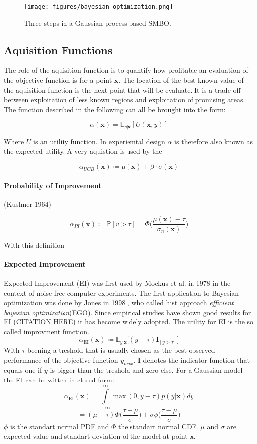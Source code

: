 \documentclass[english]{article}
\newcommand{\EI}{\operatorname{EI}}
\newcommand{\x}{\mathbf{x}}
\newcommand{\E}{\mathbb{E}}
\begin{document}
\begin{figure}
  \texttt{[image: figures/bayesian\_optimization.png]}
  \caption{Three steps in a Gaussian process based SMBO.}
  \label{bayesian optimization}
\end{figure}

\subsection{Aquisition Functions}

The role of the aquisition function is to quantify how profitable an evaluation of the objective function is for a point $\x$. The location of the best known value of the aquisition function is the next point that will be evaluate. It is a trade off between exploitation of less known regions and exploitation of promising areas. The function described in the following can all be brought into the form:

$$\alpha(\x) = \E_{y|\x}[U(\x,y)]$$

Where $U$ is an utility function. In experiemtal design $\alpha$ is therefore also known as the expected utility.
A very aquistion is used by the

$$\alpha_{UCB}(\x) \coloneqq \mu(\x) + \beta \cdot \sigma(\x) $$

\paragraph{Probability of Improvement}

(Kushner 1964)

$$
\alpha_{PI}(\x) \coloneqq \mathbb{P}[v>\tau] = \Phi\bigg(\frac{\mu(\x)-\tau}{\sigma_n(\x)}\bigg)
$$

With this definition

\paragraph{Expected Improvement}
Expected Improvement (EI) was first used by Mockus et al. in 1978 \cite{mockus_application_1978} in the context of noise free computer experiments. The first application to Bayesian optimization was done by Jones in 1998 \cite{jones_efficient_1998}, who called hist approach \textit{efficient bayesian optimization}(EGO). Since empirical studies have shown good results for EI (CITATION HERE) it has become widely adopted. The utility for EI is the so called improvment function.
$$\alpha_{\EI}(\x) \coloneqq \E_{y|\x}\big[(y - \tau)\mathbf{I}_{[y > \tau]}\big]$$
With $\tau$ beening a treshold that is usually chosen as the best observed performance of the objective function $y_{max}$. $\mathbf{I}$ denotes the indicator function that equals one if $y$ is bigger than the treshold and zero else. For a Gaussian model the EI can be witten in closed form:
$$ \alpha_{\EI}(\x) = \int\limits_{-\infty}^{\infty} \max(0, y-\tau)p(y|\x)dy$$
$$= (\mu - \tau) \Phi \bigg(\frac{\tau-\mu}{\sigma}\bigg) + \sigma \phi \bigg(\frac{\tau-\mu}{\sigma}\bigg)$$
$\phi$ is the standart normal PDF and $\Phi$ the standart normal CDF. $\mu$ and $\sigma$ are expected value and standart deviation of the model at point $\x$.
\end{document}
